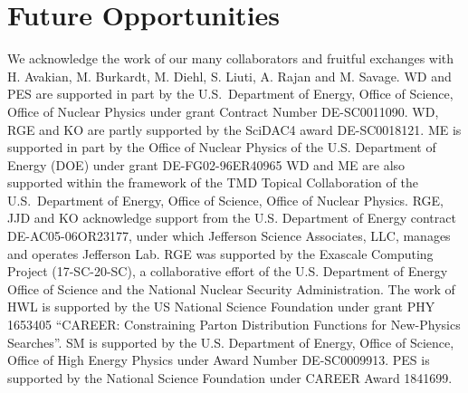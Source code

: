 \section{Future Opportunities}
\label{sec:future}



\begin{acknowledgement}
	We acknowledge the work of our many collaborators and  fruitful exchanges with H. Avakian, M. Burkardt,
	M. Diehl, S. Liuti, A. Rajan and M. Savage.
WD and PES are supported in part by the U.S.~Department of Energy,
Office of Science, Office of Nuclear Physics under grant Contract
Number DE-SC0011090. WD, RGE and KO are partly supported by the SciDAC4 award DE-SC0018121.
ME is supported in part by the Office of Nuclear Physics of the
U.S. Department of Energy (DOE) under grant DE-FG02-96ER40965
WD and ME  are also supported within the framework of the TMD Topical Collaboration of the U.S.~Department of Energy, Office of Science, Office of Nuclear Physics. 
RGE, JJD and KO acknowledge support from the U.S. Department of Energy
contract DE-AC05-06OR23177, under which Jefferson Science Associates,
LLC, manages and operates Jefferson Lab.
RGE was supported by the Exascale Computing Project (17-SC-20-SC), a collaborative effort of the U.S. Department of Energy Office of Science and the National Nuclear Security Administration.
The work of HWL  is supported by the US National Science Foundation under grant PHY 1653405 “CAREER: Constraining Parton Distribution Functions for New-Physics Searches”.
SM is supported by the U.S. Department of Energy, Office of Science, Office of High Energy Physics under Award Number DE-SC0009913.
PES is supported by the National Science Foundation under CAREER Award 1841699.  
\end{acknowledgement}







